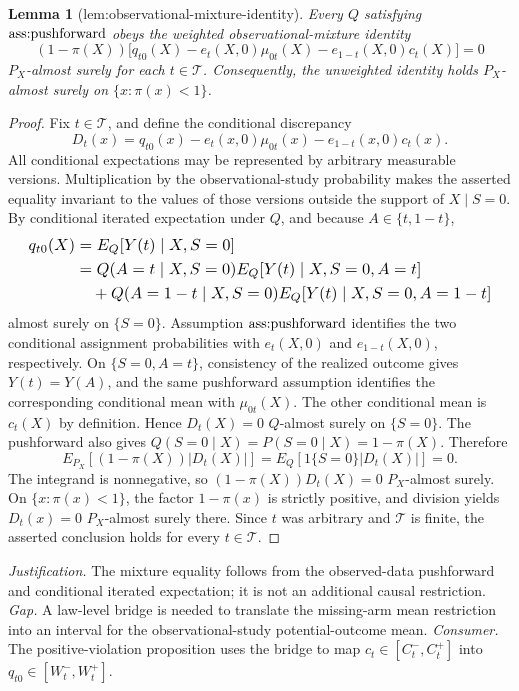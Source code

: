 \documentclass{article}
\newtheorem{lemma}{Lemma}
\begin{document}
\begin{lemma}[lem:observational-mixture-identity]\label{lem:observational-mixture-identity}
Every \(Q\) satisfying \(\textup{ass:pushforward}\) obeys the weighted observational-mixture identity\[(1-\pi(X))\bigl[q_{t0}(X)-e_t(X,0)\mu_{0t}(X)-e_{1-t}(X,0)c_t(X)\bigr]=0\]\(P_X\)-almost surely for each \(t\in\mathcal T\). Consequently, the unweighted identity holds \(P_X\)-almost surely on \(\{x:\pi(x)<1\}\).
\end{lemma}
\begin{proof}
Fix \(t\in\mathcal T\), and define the conditional discrepancy\[D_t(x)=q_{t0}(x)-e_t(x,0)\mu_{0t}(x)-e_{1-t}(x,0)c_t(x).\]All conditional expectations may be represented by arbitrary measurable versions. Multiplication by the observational-study probability makes the asserted equality invariant to the values of those versions outside the support of \(X\mid S=0\). By conditional iterated expectation under \(Q\), and because \(A\in\{t,1-t\}\),\[
\makebox[\linewidth][c]{\resizebox{0.98\linewidth}{!}{\par\noindent \makebox[\linewidth][c]{\resizebox{0.98\linewidth}{!}{\(\displaystyle \displaystyle \begin{aligned}q_{t0}(X)&=E_Q[Y(t)\mid X,S=0]\\&=Q(A=t\mid X,S=0)E_Q[Y(t)\mid X,S=0,A=t]\\&\quad+Q(A=1-t\mid X,S=0)E_Q[Y(t)\mid X,S=0,A=1-t]\end{aligned}\)}}\par\noindent}}
\]almost surely on \(\{S=0\}\). Assumption \(\textup{ass:pushforward}\) identifies the two conditional assignment probabilities with \(e_t(X,0)\) and \(e_{1-t}(X,0)\), respectively. On \(\{S=0,A=t\}\), consistency of the realized outcome gives \(Y(t)=Y(A)\), and the same pushforward assumption identifies the corresponding conditional mean with \(\mu_{0t}(X)\). The other conditional mean is \(c_t(X)\) by definition. Hence \(D_t(X)=0\) \(Q\)-almost surely on \(\{S=0\}\). The pushforward also gives \(Q(S=0\mid X)=P(S=0\mid X)=1-\pi(X)\). Therefore\[E_{P_X}[(1-\pi(X))|D_t(X)|]=E_Q[1\{S=0\}|D_t(X)|]=0.\]The integrand is nonnegative, so \((1-\pi(X))D_t(X)=0\) \(P_X\)-almost surely. On \(\{x:\pi(x)<1\}\), the factor \(1-\pi(x)\) is strictly positive, and division yields \(D_t(x)=0\) \(P_X\)-almost surely there. Since \(t\) was arbitrary and \(\mathcal T\) is finite, the asserted conclusion holds for every \(t\in\mathcal T\).
\end{proof}
\par\smallskip\noindent \textit{Justification.} The mixture equality follows from the observed-data pushforward and conditional iterated expectation; it is not an additional causal restriction. \textit{Gap.} A law-level bridge is needed to translate the missing-arm mean restriction into an interval for the observational-study potential-outcome mean. \textit{Consumer.} The positive-violation proposition uses the bridge to map \(c_t\in[C_t^-,C_t^+]\) into \(q_{t0}\in[W_t^-,W_t^+]\).
\end{document}

